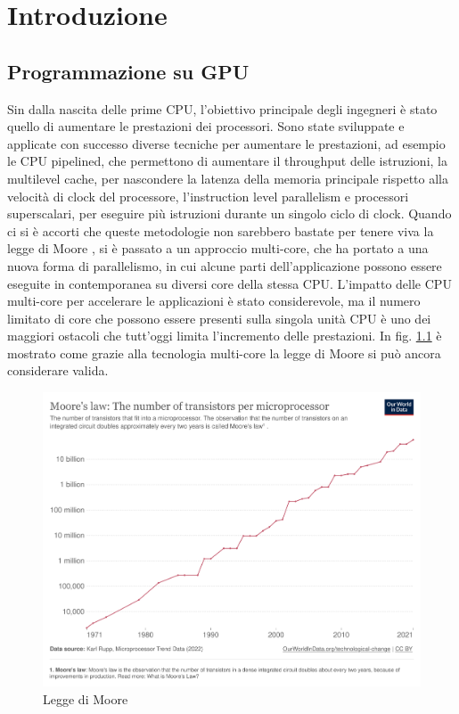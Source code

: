 \chapter{Introduzione}
\label{sec:intro}


\section[Programmazione su GPU]{Programmazione su GPU}

Sin dalla nascita delle prime \gls{CPU}, l'obiettivo principale degli ingegneri è stato quello di aumentare le prestazioni dei processori. Sono state sviluppate e applicate con successo diverse tecniche per aumentare le prestazioni, ad esempio le CPU pipelined, che permettono di aumentare il throughput delle istruzioni, la multilevel cache, per nascondere la latenza della memoria principale rispetto alla velocità di clock del processore, l'instruction level parallelism e processori superscalari, per eseguire più istruzioni durante un singolo ciclo di clock.
Quando ci si è accorti che queste metodologie non sarebbero bastate per tenere viva la legge di Moore \cite[]{Moore:law}, si è passato a un approccio multi-core, che ha portato a una nuova forma di parallelismo, in cui alcune parti dell'applicazione possono essere eseguite in contemporanea su diversi core della stessa CPU. L'impatto delle CPU multi-core per accelerare le applicazioni è stato considerevole, ma il numero limitato di core che possono essere presenti sulla singola unità CPU è uno dei maggiori ostacoli che tutt'oggi limita l'incremento delle prestazioni. In fig. \ref{fig:moore_law} è mostrato come grazie alla tecnologia multi-core la legge di Moore si può ancora considerare valida.

\begin{figure}[ht]
\centering
\includegraphics[width=.9\linewidth]{images/chapter1/moore_law2.png}
\caption{Legge di Moore}
\label{fig:moore_law}
\end{figure}


